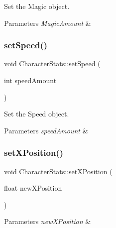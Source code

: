 Set the Magic object. 


\begin{DoxyParams}{Parameters}
{\em Magic\+Amount} & \\
\hline
\end{DoxyParams}
\mbox{\label{classCharacterStats_a12f04dfcc06dae1bc1b0ae03babd28b6}} 
\subsubsection{\texorpdfstring{setSpeed()}{setSpeed()}}
{\footnotesize\ttfamily void Character\+Stats\+::set\+Speed (\begin{DoxyParamCaption}\item[{int}]{speed\+Amount }\end{DoxyParamCaption})\hspace{0.3cm}{\ttfamily [inline]}}



Set the Speed object. 


\begin{DoxyParams}{Parameters}
{\em speed\+Amount} & \\
\hline
\end{DoxyParams}
\mbox{\label{classCharacterStats_a46c3cc5fce4e17bccb2a3b690f3ac7aa}} 
\subsubsection{\texorpdfstring{setXPosition()}{setXPosition()}}
{\footnotesize\ttfamily void Character\+Stats\+::set\+X\+Position (\begin{DoxyParamCaption}\item[{float}]{new\+X\+Position }\end{DoxyParamCaption})\hspace{0.3cm}{\ttfamily [inline]}}


\begin{DoxyParams}{Parameters}
{\em new\+X\+Position} & \\
\hline
\end{DoxyParams}
\mbox{\label{classCharacterStats_ab1ff93a3f5a89c57092b52ee6df40061}} 
